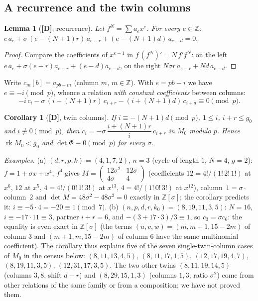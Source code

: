 \documentclass[11pt,a4paper]{article}
\newtheorem{lemma}[theorem]{Lemma}
\newtheorem{corollary}[theorem]{Corollary}
\begin{document}
\subsection*{A recurrence and the twin columns}

\begin{lemma}[\textbf{[D]}, recurrence]
\label{lem:rec}
Let $f^N=\sum a_ex^e$. For every $e\in\mathbb Z$:
$e\,a_e+\sigma\,(e-(N+1)r)\,a_{e-r}+(e-(N+1)d)\,a_{e-d}=0.$
\end{lemma}
\begin{proof}
Compare the coefficients of $x^{e-1}$ in $f\,(f^N)'=N\,f'f^N$: on the left
$e\,a_e+\sigma(e-r)a_{e-r}+(e-d)a_{e-d}$, on the right
$N\sigma r\,a_{e-r}+Nd\,a_{e-d}$.
\end{proof}

Write $c_m[b]=a_{pb-m}$ (column $m$, $m\in\mathbb Z$). With $e=pb-i$ we have
$e\equiv-i\pmod p$, whence a relation \emph{with constant coefficients} between
columns:
$$-i\,c_i-\sigma\,(i+(N+1)r)\,c_{i+r}-(i+(N+1)d)\,c_{i+d}\equiv0\pmod p .$$

\begin{corollary}[\textbf{[D]}, twin columns]
\label{cor:jum}
If $i\equiv-(N+1)d\pmod p$, $1\le i$, $i+r\le g_0$ and $i\not\equiv0\pmod p$, then
$c_i=-\sigma\,\dfrac{i+(N+1)r}{i}\,c_{i+r}$ in $M_0$ modulo $p$. Hence
$\operatorname{rk}M_0<g_0$ and $\det\Phi\equiv0\pmod p$ for every $\sigma$.
\end{corollary}

\noindent\emph{Examples.} (a) $(d,r,p,k)=(4,1,7,2)$, $n=3$ (cycle of length $1$,
$N=4$, $g=2$): $f=1+\sigma x+x^4$, $f^4$ gives
$M=\begin{pmatrix}12\sigma^2&12\sigma\\4\sigma&4\end{pmatrix}$ (coefficients
$12=4!/(1!\,2!\,1!)$ at $x^6$, $12$ at $x^5$, $4=4!/(0!\,1!\,3!)$ at $x^{13}$,
$4=4!/(1!\,0!\,3!)$ at $x^{12}$), column~$1=\sigma\cdot$ column~$2$ and
$\det M=48\sigma^2-48\sigma^2=0$ exactly in $\mathbb Z[\sigma]$; the corollary
predicts it: $i\equiv-5\cdot4=-20\equiv1\pmod7$.
(b) $(n,p,d,r,k_0)=(8,19,11,3,5)$: $N=16$, $i\equiv-17\cdot11\equiv3$, partner
$i+r=6$, and $-(3+17\cdot3)/3\equiv1$, so $c_3=\sigma c_6$: the equality is even
exact in $\mathbb Z[\sigma]$ (the terms $(u,v,w)=(m,m{+}1,15{-}2m)$ of column $3$
and $(m{+}1,m,15{-}2m)$ of column $6$ have the same multinomial coefficient).
The corollary thus explains five of the seven single-twin-column cases of $M_0$ in
the census below: $(8,11,13,4,5)$, $(8,11,17,1,5)$, $(12,17,19,4,7)$,
$(8,19,11,3,5)$, $(12,31,17,3,5)$. The two other twins $(8,11,19,14,5)$ (columns
$3,8$, shift $d-r$) and $(8,29,15,1,3)$ (columns $1,3$, ratio $\sigma^2$) come
from other relations of the same family or from a composition; we have not proved
them.
\end{document}
